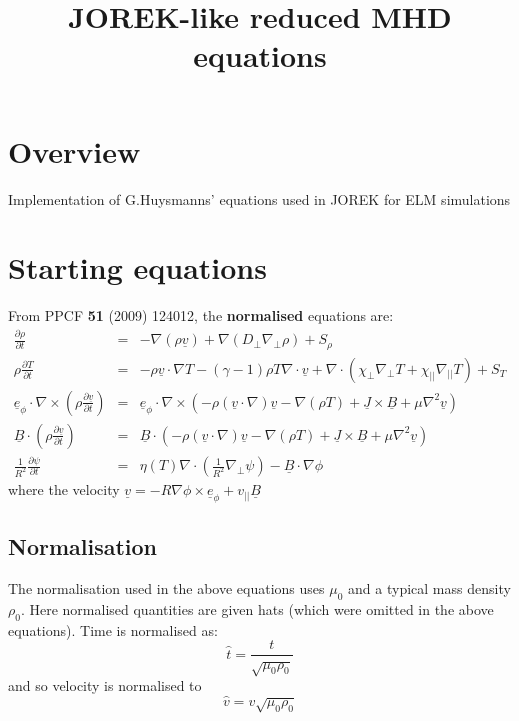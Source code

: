 \documentclass[12pt]{article}
\newcommand{\deriv}[2]{\ensuremath{\frac{\partial #1}{\partial #2}}}
\begin{document}
\title{JOREK-like reduced MHD equations}

\maketitle

\section{Overview}

Implementation of G.Huysmanns' equations used in JOREK for ELM simulations

\section{Starting equations}

From PPCF {\bf 51} (2009) 124012, the {\bf normalised} equations are:
\begin{eqnarray*}
  \deriv{\rho}{t} &=& -\nabla\left(\rho\underline{v}\right) + \nabla\left(D_\perp\nabla_\perp\rho\right) + S_\rho \\
  \rho\deriv{T}{t} &=& -\rho\underline{v}\cdot\nabla T - \left(\gamma - 1\right)\rho T\nabla\cdot\underline{v} + \nabla\cdot\left(\chi_\perp\nabla_\perp T + \chi_{||}\nabla_{||}T\right) + S_T \\
  \underline{e}_\phi\cdot\nabla\times\left(\rho\deriv{\underline{v}}{t}\right) &=& \underline{e}_\phi\cdot\nabla\times\left(-\rho\left(\underline{v}\cdot\nabla\right)\underline{v} - \nabla\left(\rho T\right) + \underline{J}\times\underline{B} + \mu\nabla^2\underline{v}\right) \\
  \underline{B}\cdot\left(\rho\deriv{\underline{v}}{t}\right) &=& \underline{B}\cdot\left(-\rho\left(\underline{v}\cdot\nabla\right)\underline{v} - \nabla\left(\rho T\right) + \underline{J}\times\underline{B} + \mu\nabla^2\underline{v}\right) \\
  \frac{1}{R^2}\deriv{\psi}{t} &=& \eta\left(T\right)\nabla\cdot\left(\frac{1}{R^2}\nabla_\perp\psi\right) - \underline{B}\cdot\nabla \phi
\end{eqnarray*}
where the velocity $\underline{v} = -R\nabla\phi\times\underline{e}_\phi + v_{||}\underline{B}$

\subsection{Normalisation}

The normalisation used in the above equations uses $\mu_0$ and 
a typical mass density $\rho_0$. Here normalised quantities are given hats
(which were omitted in the above equations). Time is normalised as:
\[
\hat{t} = \frac{t}{\sqrt{\mu_0\rho_0}}
\]
and so velocity is normalised to
\[
\hat{v} = v\sqrt{\mu_0\rho_0}
\]
\end{document}
